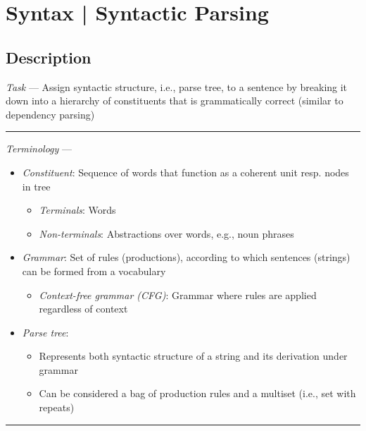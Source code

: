 \section{Syntax | Syntactic Parsing}
\subsection*{Description}
\emph{Task} --- Assign syntactic structure, i.e., parse tree, to a sentence by breaking it down into a hierarchy of constituents that is grammatically correct (similar to dependency parsing)

{\color{lightgray}\hrule height 0.001mm}

\emph{Terminology} ---
\begin{itemize}
    \item \emph{Constituent}: Sequence of words that function as a coherent unit resp. nodes in tree
    \begin{itemize}
        \item \emph{Terminals}: Words
        \item \emph{Non-terminals}: Abstractions over words, e.g., noun phrases
    \end{itemize}
    \item \emph{Grammar}: Set of rules (productions), according to which sentences (strings) can be formed from a vocabulary
    \begin{itemize}
        \item \emph{Context-free grammar (CFG)}: Grammar where rules are applied regardless of context
    \end{itemize}
    \item \emph{Parse tree}: 
    \begin{itemize}
        \item Represents both syntactic structure of a string and its derivation under grammar
        \item Can be considered a bag of production rules and a multiset (i.e., set with repeats)
    \end{itemize}
\end{itemize}

{\color{black}\hrule height 0.001mm}

